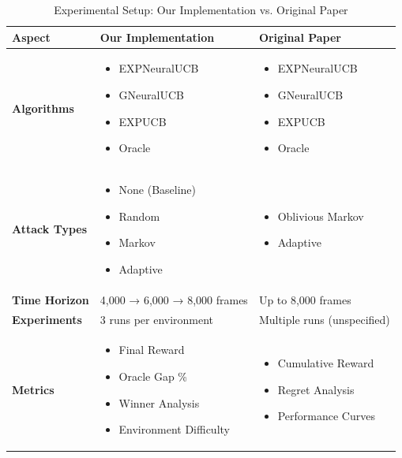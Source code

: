 \documentclass[11pt,a4paper]{article}
\begin{document}
\begin{table}[H]
\centering
\caption{Experimental Setup: Our Implementation vs. Original Paper}
\begin{tabular}{|p{3cm}|p{5.5cm}|p{5.5cm}|}
\hline
\textbf{Aspect} & \textbf{Our Implementation} & \textbf{Original Paper} \\
\hline
\hline
\textbf{Algorithms} & 
\begin{itemize}
    \item EXPNeuralUCB
    \item GNeuralUCB  
    \item EXPUCB
    \item Oracle
\end{itemize} & 
\begin{itemize}
    \item EXPNeuralUCB
    \item GNeuralUCB
    \item EXPUCB
    \item Oracle
\end{itemize} \\
\hline
\textbf{Attack Types} & 
\begin{itemize}
    \item None (Baseline)
    \item Random
    \item Markov
    \item Adaptive
\end{itemize} & 
\begin{itemize}
    \item Oblivious Markov
    \item Adaptive
\end{itemize} \\
\hline
\textbf{Time Horizon} & 4,000 → 6,000 → 8,000 frames & Up to 8,000 frames \\
\hline
\textbf{Experiments} & 3 runs per environment & Multiple runs (unspecified) \\
\hline
\textbf{Metrics} & 
\begin{itemize}
    \item Final Reward
    \item Oracle Gap \%
    \item Winner Analysis
    \item Environment Difficulty
\end{itemize} & 
\begin{itemize}
    \item Cumulative Reward
    \item Regret Analysis
    \item Performance Curves
\end{itemize} \\
\hline
\end{tabular}
\end{table}
\end{document}
